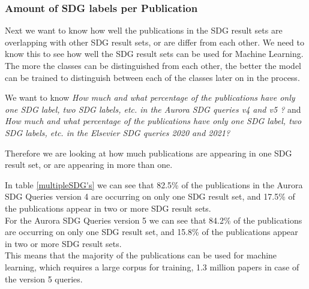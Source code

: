 \documentclass{article}
\begin{document}

\subsubsection{Amount of SDG labels per Publication}
Next we want to know how well the publications in the SDG result sets are overlapping with other SDG result sets, or are differ from each other.  
We need to know this to see how well the SDG result sets can be used for Machine Learning. The more the classes can be distinguished from each other, the better the model can be trained to distinguish between each of the classes later on in the process.

We want to know \emph{How much and what percentage of the publications have only one SDG label, two SDG labels, etc. in the Aurora SDG queries v4 and v5 ? } and \emph{How much and what percentage of the publications have only one SDG label, two SDG labels, etc. in the Elsevier SDG queries 2020 and 2021?}

Therefore we are looking at how much publications are appearing in one SDG result set, or are appearing in more than one. 

In table \ref{multipleSDG's} we can see that 82.5\%  of the publications in the Aurora SDG Queries version 4 are occurring on only one SDG result set, and 17.5\% of the publications appear in two or more SDG result sets.\\
For the Aurora SDG Queries version 5 we can see that 84.2\% of the publications are occurring on only one SDG result set, and 15.8\% of the publications appear in two or more SDG result sets.\\
This means that the majority of the publications can be used for machine learning, which requires a large corpus for training, 1.3 million papers in case of the version 5 queries.
\end{document}
